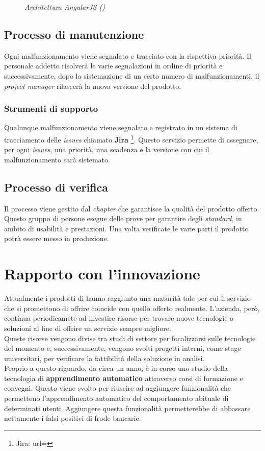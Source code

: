 \begin{itemize}
\begin{figure}[ht]
	\caption{\textit{Architettura AngularJS ()}}
\end{figure}
\end{itemize}

\subsection{Processo di manutenzione}
Ogni malfunzionamento viene segnalato e tracciato con la rispettiva priorità. Il personale addetto risolverà le varie segnalazioni in ordine di priorità e successivamente, dopo la sistemazione di un certo numero di malfunzionamenti, il \textit{project manager} rilascerà la nuova versione del prodotto.
\subsubsection{Strumenti di supporto}
Qualunque malfunzionamento viene segnalato e registrato in un sistema di tracciamento delle \textit{issues} chiamato \textbf{Jira} \footnote{Jira: url= }. Questo servizio permette di assegnare, per ogni \textit{issues}, una priorità, una scadenza e la versione con cui il malfunzionamento sarà sistemato. 
\subsection{Processo di verifica}
Il processo viene gestito dal \textit{chapter} che garantisce la qualità del prodotto offerto. Questo gruppo di persone esegue delle prove per garantire degli \textit{standard}, in ambito di usabilità e prestazioni. Una volta verificate le varie parti il prodotto potrà essere messo in produzione.






\section{Rapporto con l'innovazione}
Attualmente i prodotti di \textit{\azienda} hanno raggiunto una maturità tale per cui il servizio che si promettono di offrire coincide con quello offerto realmente. L'azienda, però, continua periodicamete ad investire risorse per trovare nuove tecnologie o soluzioni al fine di offrire un servizio sempre migliore.\\
Queste risorse vengono divise tra studi di settore per focalizzarsi sulle tecnologie del momento e, successivamente, vengono svolti progetti interni, come stage universitari, per verificare la fattibilità della soluzione in analisi. \\
Proprio a questo riguardo, da circa un anno, è in corso uno studio della tecnologia di \textbf{apprendimento automatico} attraverso corsi di formazione e convegni. Questo viene svolto per riuscire ad aggiungere funzionalità che permettono l'apprendimento automatico del comportamento abituale di determinati utenti. Aggiungere questa funzionalità permetterebbe di abbassare nettamente i falsi positivi di frode bancarie.


